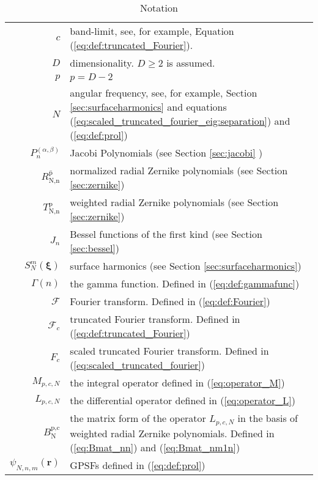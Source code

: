 \documentclass[12pt]{article}
\begin{document}
\begin{table}[htbp]
  \caption{Notation}
\begin{center}
\begin{tabular}{r p{10cm} }
\toprule
$c$ &                           band-limit, see, for example, Equation (\ref{eq:def:truncated_Fourier}). \\
$D$ &                           dimensionality. $D \ge 2$ is assumed.\\
$p$ &                           $p=D-2$ \\
$N$ &                           angular frequency, see, for example, Section \ref{sec:surfaceharmonics} and equations (\ref{eq:scaled_truncated_fourier_eig:separation}) and (\ref{eq:def:prol}) \\
$P^{(\alpha,\beta)}_n$ &         Jacobi Polynomials (see Section \ref{sec:jacobi}  )\\
$\overline{R_{\text{N,n}}^{\text{p}}}$ & normalized radial Zernike polynomials (see Section \ref{sec:zernike}) \\
$T_{\text{N,n}}^{\text{p}}$ &     weighted radial Zernike polynomials (see Section \ref{sec:zernike}) \\
$J_n$ &                       Bessel functions of the first kind (see Section \ref{sec:bessel}) \\
$S_N^m({\bm \xi})$ &            surface harmonics (see Section \ref{sec:surfaceharmonics}) \\
$\Gamma (n)$  &                 the gamma function. Defined in (\ref{eq:def:gammafunc})\\
$\mathcal{F}$ &                 Fourier transform. Defined in (\ref{eq:def:Fourier}) \\
$\mathcal{F}_c$ &               truncated Fourier transform. Defined in (\ref{eq:def:truncated_Fourier}) \\
${F}_c$ &                       scaled truncated Fourier transform. Defined in (\ref{eq:scaled_truncated_fourier}) \\
$M_{p,c,N}$ &                    the integral operator defined in (\ref{eq:operator_M}) \\
$L_{p,c,N}$ &                    the differential operator defined in (\ref{eq:operator_L}) \\
$B_{\text{N}}^{\text{p,c}}$ &       the matrix form of the operator $L_{p,c,N}$ in the basis of weighted radial Zernike polynomials. Defined in (\ref{eq:Bmat_nn}) and (\ref{eq:Bmat_nm1n})\\
$\psi_{N,n,m}({\bm r})$ &        GPSFs defined in (\ref{eq:def:prol}) \\

\end{tabular}
\end{center}
\end{table}
\end{document}
